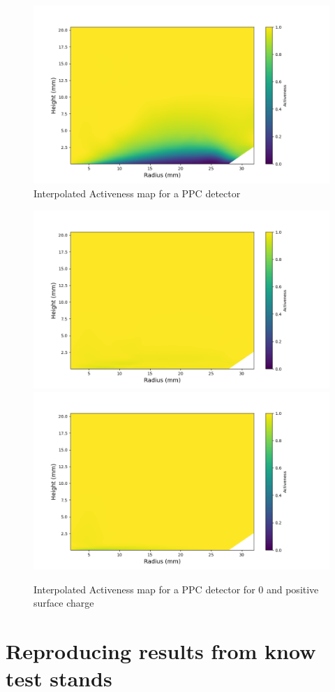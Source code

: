 \begin{figure}
\includegraphics[trim={1.4cm 0.5cm 3.2cm 1.755cm},clip,width=\linewidth]{ch5/figs/activeness_map_cubic_sc=-0.3_ponama_1_5000.png}
\caption{Interpolated Activeness map for a PPC detector \tdsim}
\label{ch5:fig:interpolated_activeness_map}
\end{figure}

\begin{figure}
\includegraphics[trim={1.5cm 0cm 3.3cm 1cm},clip,width=0.49\linewidth]{ch5/figs/activeness_map_cubic_sc=0_ponama_1_5000.png}
\includegraphics[trim={1.5cm 0cm 3.3cm 1cm},clip,width=0.49\linewidth]{ch5/figs/activeness_map_cubic_sc=0.3_ponama_1_5000.png}
\caption{Interpolated Activeness map for a PPC detector \tdsim for 0 and positive surface charge}
\label{ch5:fig:interpolated_activeness_map_0_pos}
\end{figure}


\section{\label{res:1} Reproducing results from know test stands}


